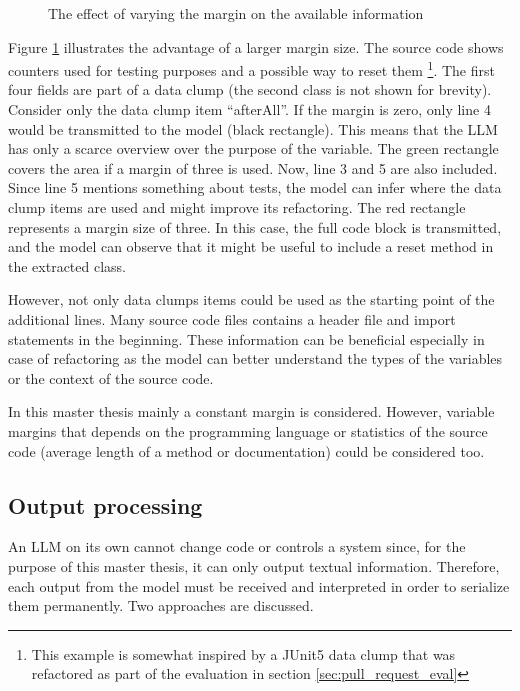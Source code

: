 \begin{figure}
    \centering
    
    \caption{The effect of varying the margin on the available information}
    \label{fig:margin_effect}
\end{figure}

Figure \ref{fig:margin_effect} illustrates the advantage of a larger margin size. The source code shows counters used for testing purposes and a possible way to reset them \footnote{This example is somewhat inspired by a JUnit5 data clump that was refactored as part of the evaluation in section \ref{sec:pull_request_eval}}. The first four fields are part of a data clump (the second class is not shown for brevity). Consider only the data clump item \enquote{afterAll}. If the margin is zero, only line 4 would be transmitted to the model (black rectangle). This means that the \ac{LLM} has only a scarce overview over the purpose of the variable.
The green rectangle covers the area if a margin of three is used. Now, line 3 and 5 are also included. Since line 5 mentions something about tests, the model can infer where the data clump items are used and might improve its refactoring. The red rectangle represents a margin size of three. In this case, the full code block is transmitted, and the model can observe that it might be useful to include a reset method in the extracted class. 

However, not only data clumps items could be used as the starting point of the additional lines. Many source code files contains a header file and import statements in the beginning. These information can be beneficial especially in case of refactoring as the model can better understand the types of the variables or the context of the source code.

In this master thesis mainly a constant margin is considered. However, variable margins that depends on the programming language or statistics of the source code (average length of a method or documentation) could be considered too.







\subsection{Output processing}\label{sec:output_processing}
An \ac{LLM} on its own cannot change code or controls a system since, for the purpose of this master thesis, it  can only output textual information. Therefore, each output from the model must be received and interpreted  in order to serialize them permanently. Two approaches are discussed. 

